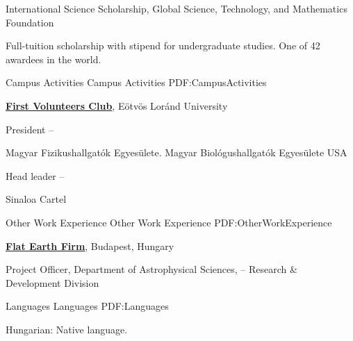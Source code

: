 \documentclass[letterpaper,yyyyMMM,nonstopmode]{simpleresumecv}
\begin{document}
\begin{Body}
\Gap
\BulletItem
International Science Scholarship,
\hfill
{}
\newline
Global Science, Technology, and Mathematics Foundation
\begin{Detail}
\Item
Full-tuition scholarship with stipend for undergraduate studies.
One of 42 awardees in the world.
\end{Detail}




\Section
{Campus Activities}
{Campus Activities}
{PDF:CampusActivities}

\Entry
\href{http://forum.szkeptikus.hu/index.php}
{\textbf{First Volunteers Club}},
Eötvös Loránd University

\Gap
\BulletItem
President
\hfill
{} --
\begin{Detail}
\SubBulletItem
Magyar Fizikushallgatók Egyesülete.
\SubBulletItem
Magyar Biológushallgatók Egyesülete
\SubBulletItem
USA
\end{Detail}
\BulletItem
Head leader
\hfill
{} --
\begin{Detail}
\SubBulletItem
Sinaloa Cartel
\end{Detail}


\Section
{Other Work\newline
Experience}
{Other Work Experience}
{PDF:OtherWorkExperience}

\Entry
\href{https://www.youtube.com/watch?v=EJpezryshsg&feature=youtu.be}
{\textbf{Flat Earth Firm}},
Budapest, Hungary

\Gap
\BulletItem
Project Officer,
Department of Astrophysical Sciences,
\hfill
{} --
\newline
Research \& Development Division


\Section
{Languages}
{Languages}
{PDF:Languages}

\BulletItem
Hungarian: Native language.


\end{Body}
\end{document}
